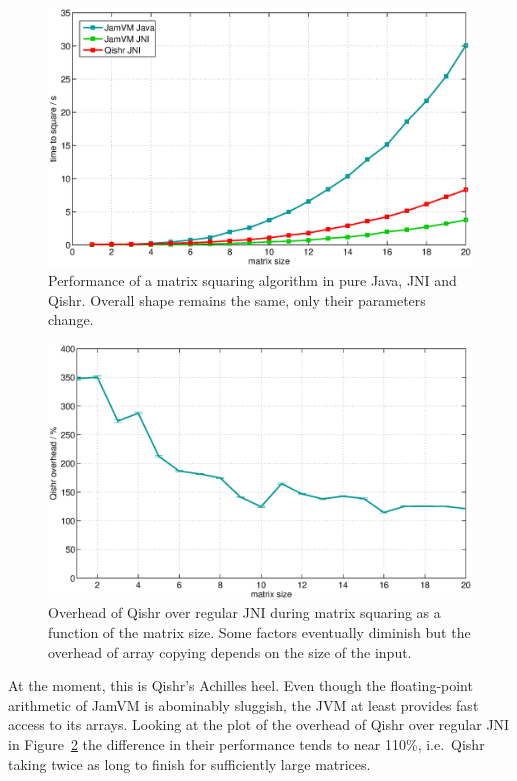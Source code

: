 \documentclass[a4paper,12pt,twoside,openright]{report}
\begin{document}
\begin{figure}[t!]
	\centering
	\includegraphics[width=1.1\textwidth]{graph_matrix.eps}
	\caption{Performance of a matrix squaring algorithm in pure Java, JNI and Qishr. Overall shape remains the same, only their parameters change.}
	\label{fig:OverheadMatrix}
\end{figure}

\begin{figure}[t!]
	\centering
	\includegraphics[width=1.1\textwidth]{graph_matrix_subtract.eps}
	\caption{Overhead of Qishr over regular JNI during matrix squaring as a function of the matrix size. Some factors eventually diminish but the overhead of array copying depends on the size of the input.}
	\label{fig:OverheadMatrixSubtract}
\end{figure}

At the moment, this is Qishr's Achilles heel. Even though the floating-point arithmetic of JamVM is abominably sluggish, the JVM at least provides fast access to its arrays. Looking at the plot of the overhead of Qishr over regular JNI in Figure~\ref{fig:OverheadMatrixSubtract} the difference in their performance tends to near 110\%, i.e.\ Qishr taking twice as long to finish for sufficiently large matrices. 
\end{document}
